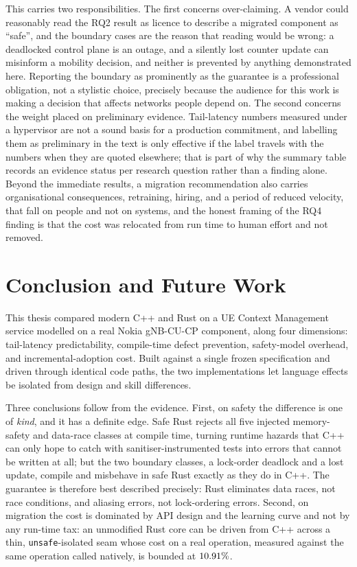 \documentclass[english,twoside,openright,a4paper,censored,csm,software-track-2020]{HYthesisML}
\begin{document}
This carries two responsibilities. The first concerns over-claiming. A vendor could reasonably read
the RQ2 result as licence to describe a migrated component as ``safe'', and the boundary cases
are the reason that reading would be wrong: a deadlocked control plane is an outage, and a
silently lost counter update can misinform a mobility decision, and neither is prevented by
anything demonstrated here. Reporting the boundary as prominently as the guarantee is a
professional obligation, not a stylistic choice, precisely because the audience for this work
is making a decision that affects networks people depend on. The second concerns the weight
placed on preliminary evidence. Tail-latency numbers measured under a hypervisor are not a
sound basis for a production commitment, and labelling them as preliminary in the text is only
effective if the label travels with the numbers when they are quoted elsewhere; that is part
of why the summary table records an evidence status per research question rather than a
finding alone. Beyond the immediate results, a migration recommendation also carries
organisational consequences, retraining, hiring, and a period of reduced velocity, that fall
on people and not on systems, and the honest framing of the RQ4 finding is that the cost
was relocated from run time to human effort and not removed.

\chapter{Conclusion and Future Work\label{chapter:conclusions}}

This thesis compared modern C++ and Rust on a UE Context Management service modelled on a real
Nokia gNB-CU-CP component, along four dimensions: tail-latency predictability, compile-time
defect prevention, safety-model overhead, and incremental-adoption cost. Built against a single
frozen specification and driven through identical code paths, the two implementations let
language effects be isolated from design and skill differences.

Three conclusions follow from the evidence. First, on safety the difference is one of
\emph{kind}, and it has a definite edge. Safe Rust rejects all five injected memory-safety and
data-race classes at compile time, turning runtime hazards that C++ can only hope to catch with
sanitiser-instrumented tests into errors that cannot be written at all; but the two boundary
classes, a lock-order deadlock and a lost update, compile and misbehave in safe Rust exactly as
they do in C++. The guarantee is therefore best described precisely: Rust eliminates data
races, not race conditions, and aliasing errors, not lock-ordering errors. Second, on migration
the cost is dominated by API design and the learning curve and not by any run-time tax: an
unmodified Rust core can be driven from C++ across a thin, \texttt{unsafe}-isolated seam whose
cost on a real operation, measured against the same operation called natively, is bounded at
$10.91\%$.
\end{document}
